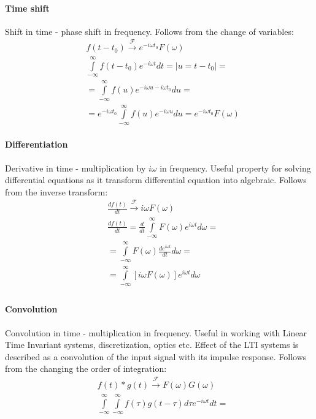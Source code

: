 \documentclass{article}
\begin{document}
\paragraph{Time shift} Shift in time - phase shift in frequency. Follows from the change of variables:
\begin{align*}
    &f(t - t_0) \xrightarrow{\mathcal{F}}  e^{-i\omega t_0} F({\omega})  \\
    &\int \limits^{\infty}_{-\infty} f(t - t_0) e^{-i\omega t}dt = \left| u=t - t_0 \right| = \\
    &=\int \limits^{\infty}_{-\infty} f(u) e^{-i\omega u - i \omega t_0}du = \\ 
    &=e^{- i \omega t_0}\int \limits^{\infty}_{-\infty} f(u) e^{-i\omega u }du =  e^{-i\omega t_0} F({\omega})
\end{align*}

\paragraph{Differentiation} Derivative in time - multiplication by $i \omega$ in frequency. 
Useful property for solving differential equations as it transform differential equation into algebraic.
 Follows from the inverse transform:
\begin{align*}
    & \frac{d f(t)}{dt} \xrightarrow{\mathcal{F}} i\omega F({\omega}) \\
    &\frac{d f(t)}{dt} = \frac{d }{dt} \int \limits^{\infty}_{-\infty} F(\omega) e^{i\omega t}d \omega = \\
    &=\int \limits^{\infty}_{-\infty}  F(\omega) \frac{d e^{i\omega t}}{dt} d \omega = \\
    &= \int \limits^{\infty}_{-\infty} \left[ i\omega F(\omega) \right] e^{i\omega t} d \omega \\
\end{align*}

\paragraph{Convolution} Convolution in time - multiplication in frequency. 
Useful in working with Linear Time Invariant systems, discretization, optics etc.
 Effect of the LTI systems is described as a convolution of the input signal with its impulse response.
 Follows from the changing the order of integration:
\begin{align*}
    &f(t) * g(t) \xrightarrow{\mathcal{F}} F(\omega) G(\omega) \\
    &\int \limits^{\infty}_{-\infty} \int \limits^{\infty}_{-\infty} f(\tau ) g(t - \tau) d \tau e^{-i\omega t}dt = 
\end{align*}
\end{document}
